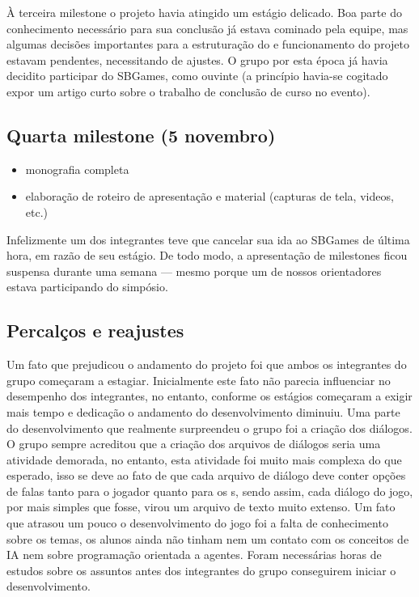 À terceira milestone o projeto havia atingido um estágio delicado. Boa parte do conhecimento necessário para sua conclusão já estava cominado pela equipe, mas algumas decisões importantes para a estruturação do e funcionamento do projeto estavam pendentes, necessitando de ajustes. O grupo por esta época já havia decidito participar do SBGames, como ouvinte (a princípio havia-se cogitado expor um artigo curto sobre o trabalho de conclusão de curso no evento).   

\subsection{Quarta milestone (5 novembro)}
\begin{itemize}
\item monografia completa
\item elaboração de roteiro de apresentação e material (capturas de tela, videos, etc.)
\end{itemize}

Infelizmente um dos integrantes teve que cancelar sua ida ao SBGames de última hora, em razão de seu estágio. De todo modo, a apresentação de milestones ficou suspensa durante uma semana --- mesmo porque um de nossos orientadores estava participando do simpósio.

\subsection{Percalços e reajustes}

Um fato que prejudicou o andamento do projeto foi que ambos os integrantes do grupo começaram a estagiar. Inicialmente este fato não parecia influenciar no desempenho dos integrantes, no entanto, conforme os estágios começaram a exigir mais tempo e dedicação o andamento do desenvolvimento diminuiu.
Uma parte do desenvolvimento que realmente surpreendeu o grupo foi a criação dos diálogos. O grupo sempre acreditou que a criação dos arquivos de diálogos seria uma atividade demorada, no entanto, esta atividade foi muito mais complexa do que esperado, isso se deve ao fato de que cada arquivo de diálogo deve conter opções de falas tanto para o jogador quanto para os \npc{}s, sendo assim, cada diálogo do jogo, por mais simples que fosse, virou um arquivo de texto muito extenso.
Um fato que atrasou um pouco o desenvolvimento do jogo foi a falta de conhecimento sobre os temas, os alunos ainda não tinham nem um contato com os conceitos de IA nem sobre programação orientada a agentes. Foram necessárias horas de estudos sobre os assuntos antes dos integrantes do grupo conseguirem iniciar o desenvolvimento.


